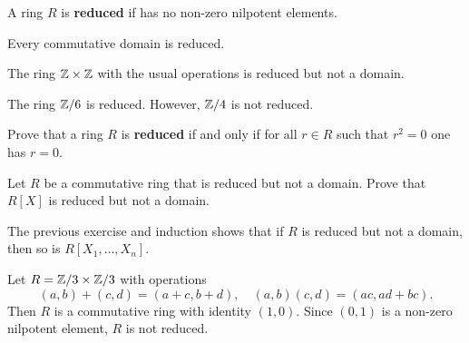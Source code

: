 
\begin{definition}
     A ring $R$ is \textbf{reduced} if 
     has no non-zero nilpotent elements. 
\end{definition}

Every commutative domain is reduced. 

\begin{example}
    The ring $\mathbb{Z}\times\mathbb{Z}$ with the usual operations 
    is reduced but not a domain. 
\end{example}

\begin{example}
    The ring $\mathbb{Z}/6$ is reduced. However, $\mathbb{Z}/4$ is not reduced. 
\end{example}

\begin{exercise}
\label{xca:reduced}
    Prove that a ring $R$ is \textbf{reduced} if and only 
    if for all $r\in R$ such that $r^2=0$ one has $r=0$.
\end{exercise}


\begin{exercise}
    \label{xca:reduced_RX}
    Let $R$ be a commutative ring that is reduced but not a domain.
    Prove that $R[X]$ is reduced but not a domain. 
\end{exercise}

The previous exercise and induction 
shows that if $R$ is reduced but not a domain, 
then so is $R[X_1,\dots,X_n]$. 

\begin{example}
    Let $R=\mathbb{Z}/3\times\mathbb{Z}/3$ with
    operations 
    \[
    (a,b)+(c,d)=(a+c,b+d),\quad 
    (a,b)(c,d)=(ac,ad+bc).
    \]
    Then $R$ is a commutative
    ring with identity $(1,0)$. Since 
    $(0,1)$ is a non-zero nilpotent element, $R$ is not reduced. 
\end{example}

